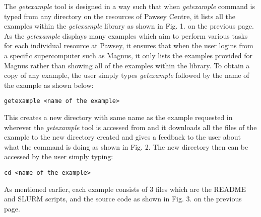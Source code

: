 The \emph{getexample} tool is designed in a way such that when \emph{getexample} command is typed from any directory on the resources of Pawsey Centre, it 
lists all the examples within the \emph{getexample} library as shown in Fig. 1. on the previous page. As the \emph{getexample} displays many examples which aim to 
perform various tasks for each individual resource at Pawsey, it ensures that when the user logins from a specific supercomputer such as Magnus, it 
only lists the examples provided for Magnus rather than showing all of the examples within the library. To obtain a copy of any example, the user simply 
types \emph{getexample} followed by the name of the example as shown below:

\begin{tcolorbox}
\begin{Verbatim}[fontsize=\scriptsize]
getexample <name of the example>
\end{Verbatim}
\end{tcolorbox}

This creates a new directory with same name as the example requested in wherever the \emph{getexample} tool is accessed from and it downloads all the files of
the example to the new directory created and gives a feedback to the user about what the command is doing as shown in Fig. 2. The new directory then can 
be accessed by the user simply typing:

\begin{tcolorbox}
\begin{Verbatim}[fontsize=\scriptsize]
cd <name of the example>
\end{Verbatim}
\end{tcolorbox}

As mentioned earlier, each example consists of 3 files which are the README and SLURM scripts, and the source code as shown in Fig. 3. on the previous
page.


